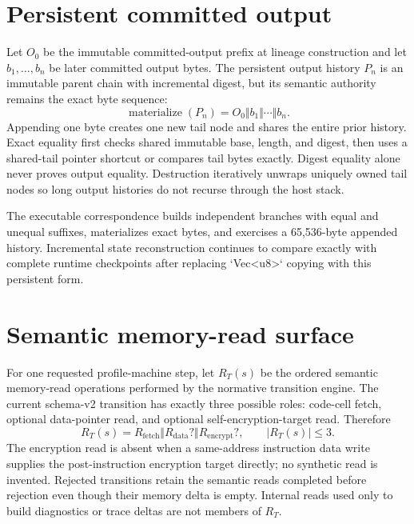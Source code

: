 \documentclass{article}
\begin{document}
\section{Persistent committed output}

Let $O_0$ be the immutable committed-output prefix at lineage construction and
let $b_1,\ldots,b_n$ be later committed output bytes. The persistent output
history $P_n$ is an immutable parent chain with incremental digest, but its
semantic authority remains the exact byte sequence:
\begin{equation}
  \operatorname{materialize}(P_n)=O_0\Vert b_1\Vert\cdots\Vert b_n.
  \label{eq:state-graph-persistent-output}
\end{equation}
Appending one byte creates one new tail node and shares the entire prior history.
Exact equality first checks shared immutable base, length, and digest, then uses a
shared-tail pointer shortcut or compares tail bytes exactly. Digest equality
alone never proves output equality. Destruction iteratively unwraps uniquely
owned tail nodes so long output histories do not recurse through the host stack.

The executable correspondence builds independent branches with equal and unequal
suffixes, materializes exact bytes, and exercises a 65,536-byte appended history.
Incremental state reconstruction continues to compare exactly with complete
runtime checkpoints after replacing `Vec<u8>` copying with this persistent form.

\section{Semantic memory-read surface}

For one requested profile-machine step, let $R_T(s)$ be the ordered semantic
memory-read operations performed by the normative transition engine. The current
schema-v2 transition has exactly three possible roles: code-cell fetch, optional
data-pointer read, and optional self-encryption-target read. Therefore
\begin{equation}
  R_T(s)=R_{\mathrm{fetch}}\Vert R_{\mathrm{data}}?
         \Vert R_{\mathrm{encrypt}}?,
  \qquad |R_T(s)|\leq3.
  \label{eq:state-graph-profile-read-bound}
\end{equation}
The encryption read is absent when a same-address instruction data write supplies
the post-instruction encryption target directly; no synthetic read is invented.
Rejected transitions retain the semantic reads completed before rejection even
though their memory delta is empty. Internal reads used only to build diagnostics
or trace deltas are not members of $R_T$.
\end{document}
